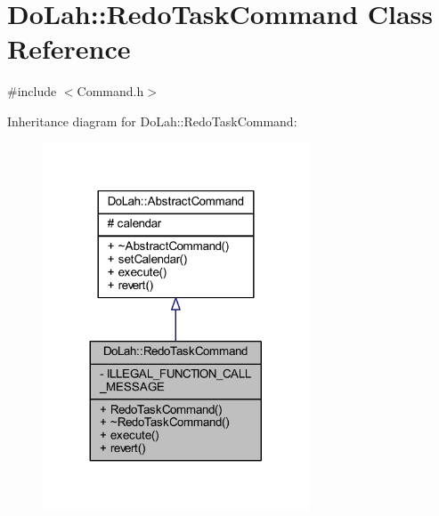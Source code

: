 \hypertarget{class_do_lah_1_1_redo_task_command}{}\section{Do\+Lah\+:\+:Redo\+Task\+Command Class Reference}
\label{class_do_lah_1_1_redo_task_command}


{\ttfamily \#include $<$Command.\+h$>$}



Inheritance diagram for Do\+Lah\+:\+:Redo\+Task\+Command\+:\nopagebreak
\begin{figure}[H]
\begin{center}
\leavevmode
\includegraphics[width=224pt]{class_do_lah_1_1_redo_task_command__inherit__graph}
\end{center}
\end{figure}


